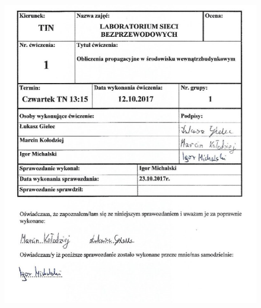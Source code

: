 \documentclass[12pt, a4paper, oneside]{article}
\begin{document}
\begin{figure}[h]
\centering
\includegraphics[scale=0.8]{title_page.png}
\end{figure}
\clearpage
{}
\end{document}
